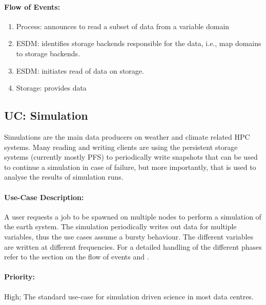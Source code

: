 \paragraph{Flow of Events:}
\begin{enumerate}
	\item Process: announces to read a subset of data from a variable domain
	\item ESDM: identifies storage backends responsible for the data, i.e., map domains to storage backends.
	\item ESDM: initiates read of data on storage.
	\item Storage: provides data
\end{enumerate}






\subsection{UC: Simulation}
\label{uc: simulation}

Simulations are the main data producers on weather and climate related HPC systems.
Many reading and writing clients are using the persistent storage systems (currently mostly PFS) to periodically write snapshots that can be used to continue a simulation in case of failure, but more importantly, that is used to analyse the results of simulation runs.

\paragraph{Use-Case Description:}
A user requests a job to be spawned on multiple nodes to perform a simulation of the earth system.
The simulation periodically writes out data for multiple variables, thus the use cases assume a bursty behaviour.
The different variables are written at different frequencies.
For a detailed handling of the different phases refer to the section on the flow of events and .



\paragraph{Priority:}
High; The standard use-case for simulation driven science in most data centres.

